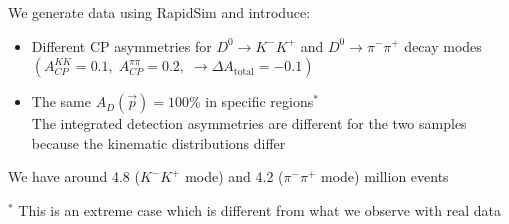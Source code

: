 \documentclass{beamer}
\begin{document}
\begin{frame}
      \frametitle{\insertsubsectionhead}
      \rightarrow We generate data using RapidSim and introduce:
      \begin{itemize}
            \item Different CP asymmetries for $D^0\to K^-K^+$ and $D^0\to\pi^-\pi^+$ decay modes $\left(A_{CP}^{KK} = 0.1,\; A_{CP}^{\pi\pi} = 0.2,\; \rightarrow \Delta A_\text{total} = -0.1\right)$
            \item The same $A_D(\vec{p}) = 100\%$ in specific regions$^*$ \\ \rightarrow The integrated detection asymmetries are different for the two samples because the kinematic distributions differ
      \end{itemize}
      \rightarrow We have around 4.8 ($K^-K^+$ mode) and 4.2 ($\pi^-\pi^+$ mode) million events
      \begin{figure}
            \centering
      \end{figure}
      \scriptsize
      $^*$ This is an extreme case which is different from what we observe with real data
\end{frame}
\end{document}

